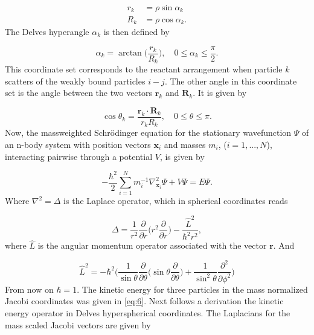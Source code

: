 \documentclass{article}
\begin{document}
\begin{subequations}
	\begin{align}
		r_{k} &= \rho \sin{\alpha_{k}}\\
		R_{k} &= \rho \cos{\alpha_{k}}.
	\end{align}
\end{subequations}
The Delves hyperangle $\alpha_{k}$ is then defined by

\begin{equation}
	\alpha_{k} = \arctan\bigg(\frac{r_{k}}{R_{k}}\bigg), \quad 0\leq \alpha_{k} \leq \frac{\pi}{2}.
\end{equation}
This coordinate set corresponds to the reactant arrangement when particle $k$ scatters of the weakly bound particles $i-j$. The other angle in this coordinate set is the angle between the two vectors $\mathbf{r}_{k}$ and $\mathbf{R}_{k}$. It is given by

\begin{equation}
\cos{\theta_{k}} = \frac{\mathbf{r}_{k} \cdot \mathbf{R}_{k}}{r_{k} R_{k}}, \quad  0\leq \theta \leq \pi.
\end{equation}
Now, the massweighted Schr{\"o}dinger equation for the stationary wavefunction $\Psi$ of an n-body system with position vectors $\mathbf{x}_i$ and masses $m_i$, ($i=1,...,N$), interacting pairwise through a potential $V$, is given by

\begin{equation}
-\frac{\hbar^2}{2} \sum_{i=1}^{N} m^{-1}_{i} \nabla^{2}_{\mathbf{x}_{i}} \Psi + V\Psi = E \Psi. 
\end{equation}
Where $\nabla^{2}=\Delta$ is the Laplace operator, which in spherical coordinates reads

\begin{equation}
\Delta = \frac{1}{r^{2}}\frac{\partial}{\partial r} \bigg(r^{2} \frac{\partial}{\partial r}\bigg) - \frac{\hat{L}^{2}}{\hbar^2 r^{2}},
\end{equation}
where $\hat{L}$ is the angular momentum operator associated with the vector $\mathbf{r}$. And

\begin{equation}
\hat{L}^{2} = -\hbar^{2}\Bigg(\frac{1}{\sin{\theta}}\frac{\partial}{\partial \theta} \bigg(\sin{\theta}\frac{\partial}{\partial \theta}\bigg) + \frac{1}{\sin^{2}{\theta}} \frac{\partial^{2}}{\partial \phi^{2}}\Bigg)
\end{equation}
From now on $\hbar = 1$. The kinetic energy for three particles in the mass normalized Jacobi coordinates was given in \eqref{eq:6}. Next follows a derivation the kinetic energy operator in Delves hyperspherical coordinates. The Laplacians for the mass scaled Jacobi vectors are given by
\end{document}
